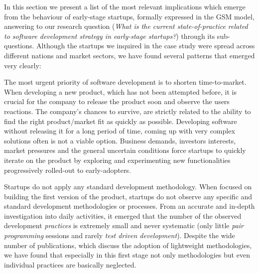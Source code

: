 \documentclass[10pt,journal,letterpaper,compsoc]{IEEEtran}
\begin{document}
In this section we present a list of the most relevant implications which emerge from the behaviour of early-stage startups, formally expressed in the GSM model, answering to our research question (\textit{What is the current state-of-practice related to software development strategy in early-stage startups?}) through its sub-questions. Although the startups we inquired in the case study were spread across different nations and market sectors, we have found several patterns that emerged very clearly:

\begin{compactitem}
 

\item The most urgent priority of software development is to shorten time-to-market. When developing a new product, which has not been attempted before, it is crucial for the company to release the product soon and observe the users reactions. The company's chances to survive, are strictly related to the ability to find the right product/market fit as quickly as possible. Developing software without releasing it for a long period of time, coming up with very complex solutions often is not a viable option. Business demands, investors interests, market pressures and the general uncertain conditions force startups to quickly iterate on the product by exploring and experimenting new functionalities progressively rolled-out to early-adopters.


\item Startups do not apply any standard development methodology. When focused on building the first version of the product, startups do not observe any specific and standard development methodologies or processes.  From an accurate and in-depth investigation into daily activities, it emerged that the number of  the observed development \textit{practices} is extremely small and never systematic (only little \textit{pair programming} sessions and rarely \textit{test driven development}). Despite the wide number of publications, which discuss the adoption of lightweight methodologies, we have found that especially in this first stage not only methodologies but even individual practices are basically neglected. 


\end{compactitem}
\end{document}
